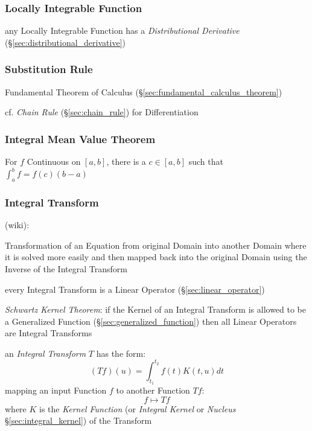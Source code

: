 {\subsubsection{Locally Integrable Function}\label{sec:locally_integrable}

any Locally Integrable Function has a \emph{Distributional Derivative}
(\S\ref{sec:distributional_derivative})



\subsubsection{Substitution Rule}\label{sec:substitution_rule}

Fundamental Theorem of Calculus (\S\ref{sec:fundamental_calculus_theorem})

\fist cf. \emph{Chain Rule} (\S\ref{sec:chain_rule}) for Differentiation



\subsubsection{Integral Mean Value Theorem}
\label{sec:integral_mean_value}

For $f$ Continuous on $[a,b]$, there is a $c \in [a,b]$ such that
$\int_a^b f = f(c)(b - a)$



\subsubsection{Integral Transform}\label{sec:integral_transform}

(wiki):

Transformation of an Equation from original Domain into another Domain where it
is solved more easily and then mapped back into the original Domain using the
Inverse of the Integral Transform

every Integral Transform is a Linear Operator (\S\ref{sec:linear_operator})

\emph{Schwartz Kernel Theorem}: if the Kernel of an Integral Transform is
allowed to be a Generalized Function (\S\ref{sec:generalized_function}) then
all Linear Operators are Integral Transforms

an \emph{Integral Transform} $T$ has the form:
\[
  (T f)(u) = \int_{t_1}^{t_2} f(t) K(t,u) dt
\]
mapping an input Function $f$ to another Function $T f$:
\[
  f \mapsto T f
\]
where $K$ is the \emph{Kernel Function} (or \emph{Integral Kernel} or
\emph{Nucleus} \S\ref{sec:integral_kernel}) of the Transform

}
